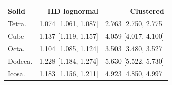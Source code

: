\begin{tabular}{lrr}
\toprule
Solid & IID lognormal & Clustered \\
\midrule
Tetra. & 1.074 [1.061, 1.087] & 2.763 [2.750, 2.775] \\
Cube & 1.137 [1.119, 1.157] & 4.059 [4.017, 4.100] \\
Octa. & 1.104 [1.085, 1.124] & 3.503 [3.480, 3.527] \\
Dodeca. & 1.228 [1.184, 1.274] & 5.630 [5.522, 5.730] \\
Icosa. & 1.183 [1.156, 1.211] & 4.923 [4.850, 4.997] \\
\bottomrule
\end{tabular}
